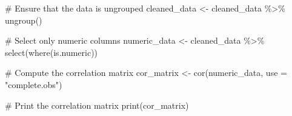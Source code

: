 \documentclass[
  12pt,
]{article}
\newenvironment{Shaded}{\begin{snugshade}}{\end{snugshade}}
\newcommand{\AttributeTok}[1]{\textcolor[rgb]{0.40,0.45,0.13}{#1}}
\newcommand{\CommentTok}[1]{\textcolor[rgb]{0.37,0.37,0.37}{#1}}
\newcommand{\FunctionTok}[1]{\textcolor[rgb]{0.28,0.35,0.67}{#1}}
\newcommand{\NormalTok}[1]{\textcolor[rgb]{0.00,0.23,0.31}{#1}}
\newcommand{\OtherTok}[1]{\textcolor[rgb]{0.00,0.23,0.31}{#1}}
\newcommand{\SpecialCharTok}[1]{\textcolor[rgb]{0.37,0.37,0.37}{#1}}
\newcommand{\StringTok}[1]{\textcolor[rgb]{0.13,0.47,0.30}{#1}}
\begin{document}
\begin{Shaded}
\begin{Highlighting}[]
\CommentTok{\# Ensure that the data is ungrouped}
\NormalTok{cleaned\_data }\OtherTok{\textless{}{-}}\NormalTok{ cleaned\_data }\SpecialCharTok{\%\textgreater{}\%} \FunctionTok{ungroup}\NormalTok{()}

\CommentTok{\# Select only numeric columns}
\NormalTok{numeric\_data }\OtherTok{\textless{}{-}}\NormalTok{ cleaned\_data }\SpecialCharTok{\%\textgreater{}\%}
  \FunctionTok{select}\NormalTok{(}\FunctionTok{where}\NormalTok{(is.numeric))}

\CommentTok{\# Compute the correlation matrix}
\NormalTok{cor\_matrix }\OtherTok{\textless{}{-}} \FunctionTok{cor}\NormalTok{(numeric\_data, }\AttributeTok{use =} \StringTok{"complete.obs"}\NormalTok{)}

\CommentTok{\# Print the correlation matrix}
\FunctionTok{print}\NormalTok{(cor\_matrix)}
\end{Highlighting}
\end{Shaded}
\end{document}
